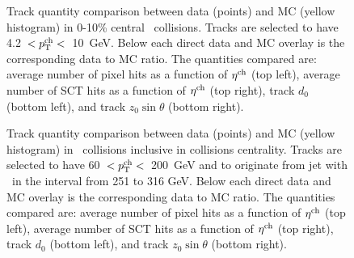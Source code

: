 \begin{figure}
\caption{Track quantity comparison between data (points) and MC (yellow histogram) in 0-10\%
   central \pbpb\ collisions.  
Tracks are selected to have 4.2~$<\mbox{$p_{\mathrm{T}}^{\mathrm{ch}}$}<$~10~GeV. Below each direct data and MC overlay is the 
corresponding data to MC ratio.  The quantities compared are: average number of pixel hits as a function
of $\mbox{$\eta^{\mathrm{ch}}$}$ (top left), average number of SCT hits as a function of $\mbox{$\eta^{\mathrm{ch}}$}$ (top right),
track $d_0$ (bottom left), and track $z_0 \sin\theta$ (bottom right).}
\label{fig:trkdataMCcomp_pbpb}
\end{figure}

\begin{figure}
\caption{Track quantity comparison between data (points) and MC (yellow histogram) in \pbpb\ collisions inclusive in collisions centrality.  
Tracks are selected to have 60~$<\mbox{$p_{\mathrm{T}}^{\mathrm{ch}}$}<$~200~GeV and to originate from jet with \pt\ in the interval from 251 to 316 GeV. Below each direct data and MC overlay is the 
corresponding data to MC ratio.  The quantities compared are: average number of pixel hits as a function
of $\mbox{$\eta^{\mathrm{ch}}$}$ (top left), average number of SCT hits as a function of $\mbox{$\eta^{\mathrm{ch}}$}$ (top right),
track $d_0$ (bottom left), and track $z_0 \sin\theta$ (bottom right).}
\label{fig:trkdataMCcomp_pbpb_highpt}
\end{figure}


